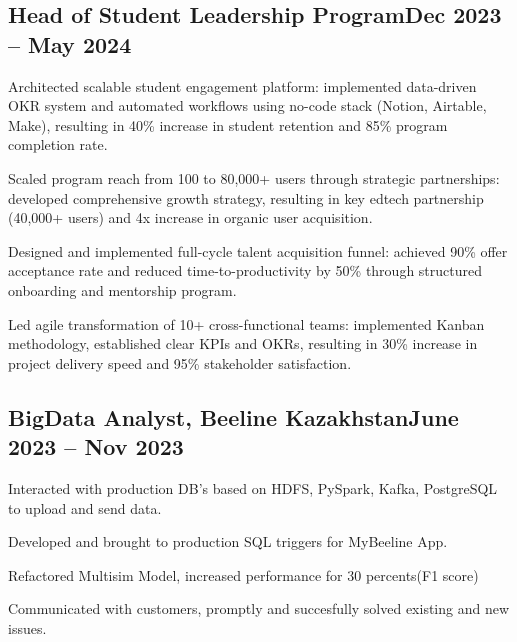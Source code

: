 \documentclass[a4paper,12pt]{article}
\begin{document}
\subsection{{Head of Student Leadership Program}\hfill Dec 2023 -- May 2024}
\begin{zitemize}
\item Architected scalable student engagement platform: implemented data-driven OKR system and automated workflows using no-code stack (Notion, Airtable, Make), resulting in 40\% increase in student retention and 85\% program completion rate.
\item Scaled program reach from 100 to 80,000+ users through strategic partnerships: developed comprehensive growth strategy, resulting in key edtech partnership (40,000+ users) and 4x increase in organic user acquisition.
\item Designed and implemented full-cycle talent acquisition funnel: achieved 90\% offer acceptance rate and reduced time-to-productivity by 50\% through structured onboarding and mentorship program.
\item Led agile transformation of 10+ cross-functional teams: implemented Kanban methodology, established clear KPIs and OKRs, resulting in 30\% increase in project delivery speed and 95\% stakeholder satisfaction.
\end{zitemize}

\vspace*{6pt}
\subsection{{BigData Analyst, Beeline Kazakhstan}\hfill June 2023 -- Nov 2023}
\begin{zitemize}
\item Interacted with production DB's based on HDFS, PySpark, Kafka, PostgreSQL to upload and send data.
\item Developed and brought to production SQL triggers for MyBeeline App.
\item Refactored  Multisim Model, increased performance for 30 percents(F1 score)
\item Communicated with customers, promptly and succesfully solved existing and new issues.
\end{zitemize}

\end{document}
